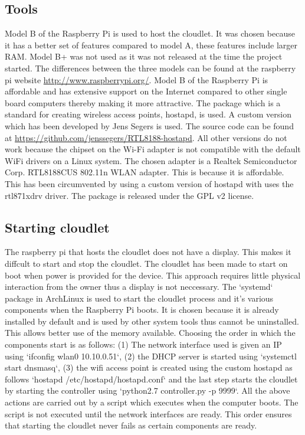 \subsection{Tools}
Model B of the Raspberry Pi is used to host the cloudlet. It was chosen because it has a better set of features compared to model A, these features include larger RAM. Model B+ was not used as it was not released at the time the project started. The differences between the three
models can be found at the raspberry pi website \url{http://www.raspberrypi.org/}. Model B of the Raspberry Pi is affordable and has extensive support on the Internet compared to other single board computers thereby making it more attractive. The package which is a standard for creating wireless access points, hostapd, is used. A custom version which has been developed by Jens Segers is used. The source code can be found at \url{https://github.com/jenssegers/RTL8188-hostapd}. All other versions do not work because the chipset on the
Wi-Fi adapter is not compatible with the default WiFi drivers on a Linux system. The chosen adapter is a Realtek Semiconductor Corp. RTL8188CUS 802.11n WLAN adapter. This is because it is affordable. This has been circumvented by using a custom version of hostapd with uses the rtl871xdrv driver. The package is released under the GPL v2 license.

\subsection{Starting cloudlet}
The raspberry pi that hosts the cloudlet does not have a display. This makes it diffcult to start and stop the cloudlet. The cloudlet has been made to start on boot when power is provided for the device. This approach requires little physical interaction from the owner thus a display is not neccessary. The `systemd` package in ArchLinux is used to start the cloudlet process and it's various components when the Raspberry Pi boots. It is chosen because it is already installed by default and is used by other system tools thus cannot be uninstalled. This allows better use of the memory available. Choosing the order in which the components start is as follows: (1) The network interface used is given an IP using `ifconfig wlan0 10.10.0.51`,  (2) the DHCP server is started using `systemctl start dnsmasq`, (3) the wifi access point is created using the custom hostapd as follows `hostapd /etc/hostapd/hostapd.conf` and the last step starts the cloudlet by starting the controller using `python2.7 controller.py -p 9999`. All the above actions are carried out by a script which executes when the computer boots. The script is not executed until the network interfaces are ready. This order ensures that starting the cloudlet never fails as certain components are ready.
